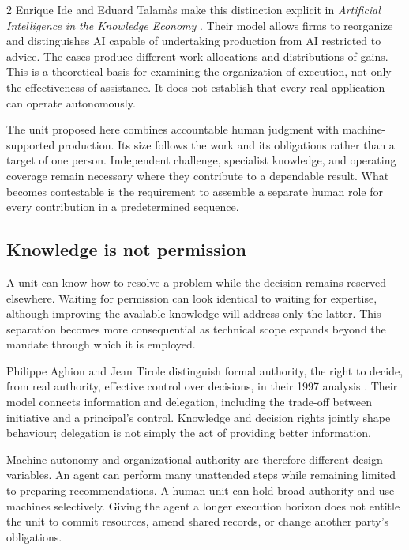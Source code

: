 \begin{multicols}{2}
Enrique Ide and Eduard Talamàs make this distinction explicit in
\emph{Artificial Intelligence in the Knowledge Economy}
\citep{ide2025knowledge}. Their model allows firms to reorganize and
distinguishes AI capable of undertaking production from AI restricted to
advice. The cases produce different work allocations and distributions
of gains. This is a theoretical basis for examining the organization of
execution, not only the effectiveness of assistance. It does not
establish that every real application can operate autonomously.

The unit proposed here combines accountable human judgment with
machine-supported production. Its size follows the work and its
obligations rather than a target of one person. Independent challenge,
specialist knowledge, and operating coverage remain necessary where they
contribute to a dependable result. What becomes contestable is the
requirement to assemble a separate human role for every contribution in
a predetermined sequence.

\subsection{Knowledge is not
permission}\label{knowledge-is-not-permission}

A unit can know how to resolve a problem while the decision remains
reserved elsewhere. Waiting for permission can look identical to waiting
for expertise, although improving the available knowledge will address
only the latter. This separation becomes more consequential as technical
scope expands beyond the mandate through which it is employed.

Philippe Aghion and Jean Tirole distinguish formal authority, the right
to decide, from real authority, effective control over decisions, in
their 1997 analysis \citep{aghion1997authority}. Their model connects
information and delegation, including the trade-off between initiative
and a principal's control. Knowledge and decision rights jointly shape
behaviour; delegation is not simply the act of providing better
information.

Machine autonomy and organizational authority are therefore different
design variables. An agent can perform many unattended steps while
remaining limited to preparing recommendations. A human unit can hold
broad authority and use machines selectively. Giving the agent a longer
execution horizon does not entitle the unit to commit resources, amend
shared records, or change another party's obligations.


\end{multicols}
